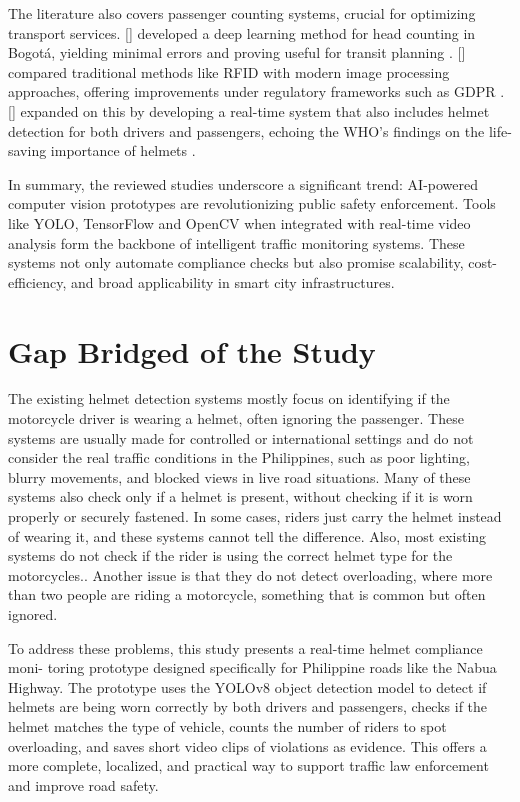 \begin{refsection}
The literature also covers passenger counting systems, crucial for optimizing transport services. \citeauthor{rendon2023passenger} [\citeyear{rendon2023passenger}] developed a deep learning method for head counting in Bogotá, yielding minimal errors and proving useful for transit planning \cite{rendon2023passenger}. \citeauthor{radovan2024passenger} [\citeyear{radovan2024passenger}] compared traditional methods like RFID with modern image processing approaches, offering improvements under regulatory frameworks such as GDPR \cite{radovan2024passenger}. \citeauthor{bhatt2024ai} [\citeyear{bhatt2024ai}] expanded on this by developing a real-time system that also includes helmet detection for both drivers and passengers, echoing the WHO’s findings on the life-saving importance of helmets \cite{bhatt2024ai}.

In summary, the reviewed studies underscore a significant trend: AI-powered computer vision prototypes are revolutionizing public safety enforcement. Tools like YOLO, TensorFlow and OpenCV when integrated with real-time video analysis form the backbone of intelligent traffic monitoring systems. These systems not only automate compliance checks but also promise scalability, cost-efficiency, and broad applicability in smart city infrastructures.

\section{Gap Bridged of the Study}
The existing helmet detection systems mostly focus on identifying if the motorcycle driver is wearing a helmet, often ignoring the passenger. These systems are usually made for controlled or international settings and do not consider the real traffic conditions in the Philippines, such as poor lighting, blurry movements, and blocked views in live road situations. Many of these systems also check only if a helmet is present, without checking if it is worn properly or securely fastened. In some cases, riders just carry the helmet instead of wearing it, and these systems cannot tell the difference. Also, most existing systems do not check if the rider is using the correct helmet type for the motorcycles.. Another issue is that they do not detect overloading, where more than two people are riding a motorcycle, something that is common but often ignored.

To address these problems, this study presents a real-time helmet compliance moni- toring prototype designed specifically for Philippine roads like the Nabua Highway. The prototype uses the YOLOv8 object detection model to detect if helmets are being worn correctly by both drivers and passengers, checks if the helmet matches the type of vehicle, counts the number of riders to spot overloading, and saves short video clips of violations as evidence. This offers a more complete, localized, and practical way to support traffic law enforcement and improve road safety.



\clearpage

\printbibliography[heading=subbibintoc, title={\texorpdfstring{\centering}{} Notes}]
\end{refsection}